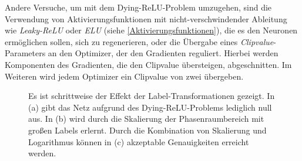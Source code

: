 Andere Versuche, um mit dem Dying-ReLU-Problem umzugehen, sind die Verwendung von Aktivierungsfunktionen mit nicht-verschwindender Ableitung wie \textit{Leaky-ReLU} oder \textit{ELU} (siehe \textsf{\autoref{Aktivierungsfunktionen}}), die es den Neuronen ermöglichen sollen, sich zu regenerieren, oder die Übergabe eines \textit{Clipvalue}-Parameters an den Optimizer, der den Gradienten reguliert. Hierbei werden Komponenten des Gradienten, die den Clipvalue übersteigen, abgeschnitten. Im Weiteren wird jedem Optimizer ein Clipvalue von zwei übergeben. 
\begin{figure}[ht]
	\centering
	\captionsetup{justification=justified}
	\caption{Es ist schrittweise der Effekt der Label-Transformationen gezeigt. In (a) gibt das Netz aufgrund des Dying-ReLU-Problems lediglich null aus. In (b) wird durch die Skalierung der Phasenraumbereich mit großen Labels erlernt. Durch die Kombination von Skalierung und Logarithmus können in (c) akzeptable Genauigkeiten erreicht werden.} 
	\label{DyingReluAction}
\end{figure}

